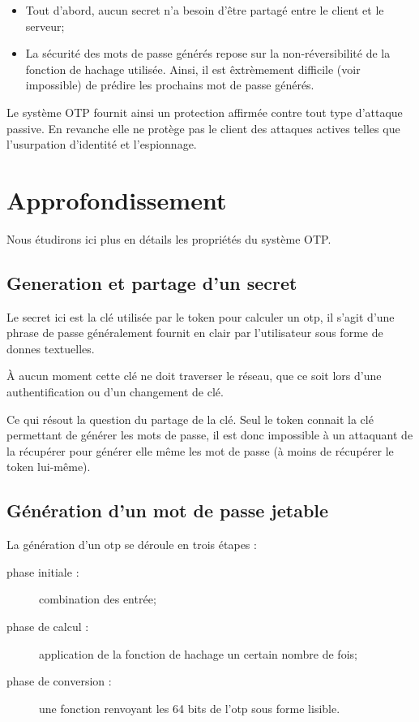 \documentclass{../res/univ-projet}
\begin{document}
  \begin{itemize}
    \item Tout d'abord, aucun secret n'a besoin d'être partagé entre le client 
et le serveur;
    \item La sécurité des mots de passe générés repose sur la non-réversibilité 
de la fonction de hachage utilisée. Ainsi, il est \^extrèmement difficile (voir 
impossible) de prédire les prochains mot de passe générés.\\
  \end{itemize}

  Le système OTP fournit ainsi un protection affirmée contre tout type d'attaque 
passive. En revanche elle ne protège pas le client des attaques actives telles 
que l'usurpation d'identité et l'espionnage.

\section{Approfondissement}
  Nous étudirons ici plus en détails  les propriétés du système OTP.

  \subsection{Generation et partage d'un secret}
    Le secret ici est la clé utilisée par le token pour calculer un otp, il 
s'agit d'une phrase de passe généralement fournit en clair par l'utilisateur 
sous forme de donnes textuelles. 

    À aucun moment cette clé ne doit traverser le réseau, que ce soit lors d'une 
authentification ou d'un changement de clé.

    Ce qui résout la question du partage de la clé. Seul le token connait la clé 
permettant de générer les mots de passe, il est donc impossible à un attaquant 
de la récupérer pour générer elle même les mot de passe (à moins de récupérer le 
token lui-même).
  
  \subsection{Génération d'un mot de passe jetable}

    La génération d'un otp se déroule en trois étapes :
    \begin{description}
      \item [phase initiale :] combination des entrée;
      \item [phase de calcul :] application de la fonction de hachage un certain 
nombre de fois;
      \item [phase de conversion :] une fonction renvoyant les 64 bits de l'otp 
sous forme lisible.\\
    \end{description}
\end{document}
